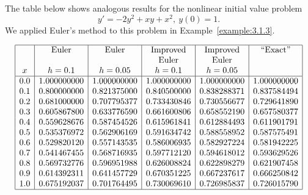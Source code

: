 \documentclass{ximera}
\begin{document}
\begin{example}\label{example:3.2.3}
The table below shows analogous results for the nonlinear
initial value problem
$$
y'=-2y^2+xy+x^2,\ y(0)=1.
$$
We applied Euler's  method to this problem in
Example~\ref{example:3.1.3}.


\[
\begin{array}{|c|c|c|c|c|c|}
\hline
 &\text{Euler} &\text{Euler} &\text{Improved} &\text{Improved}& \text{ ``Exact'' }\\
 & & &\text{Euler}&\text{Euler}& \\
x&h=0.1&h=0.05&h=0.1&h=0.05&
\\ \hline
0.0 & 1.000000000 & 1.000000000 &1.000000000 & 1.000000000 & 1.000000000 \\
0.1 & 0.800000000 & 0.821375000 &0.840500000 & 0.838288371 & 0.837584494 \\
0.2 & 0.681000000 & 0.707795377 &0.733430846 & 0.730556677 & 0.729641890 \\
0.3 & 0.605867800 & 0.633776590 &0.661600806 & 0.658552190 & 0.657580377 \\
0.4 & 0.559628676 & 0.587454526 &0.615961841 & 0.612884493 & 0.611901791 \\
0.5 & 0.535376972 & 0.562906169 &0.591634742 & 0.588558952 & 0.587575491 \\
0.6 & 0.529820120 & 0.557143535 &0.586006935 & 0.582927224 & 0.581942225 \\
0.7 & 0.541467455 & 0.568716935 &0.597712120 & 0.594618012 & 0.593629526 \\
0.8 & 0.569732776 & 0.596951988 &0.626008824 & 0.622898279 & 0.621907458 \\
0.9 & 0.614392311 & 0.641457729 &0.670351225 & 0.667237617 & 0.666250842 \\
1.0 & 0.675192037 & 0.701764495 &0.730069610 & 0.726985837 & 0.726015790\\
\hline
\end{array}
\]
\end{example}
\end{document}
